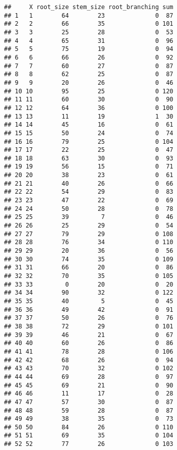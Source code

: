 \documentclass[
]{article}
\begin{document}
\begin{verbatim}
##     X root_size stem_size root_branching sum
## 1   1        64        23              0  87
## 2   2        66        35              0 101
## 3   3        25        28              0  53
## 4   4        65        31              0  96
## 5   5        75        19              0  94
## 6   6        66        26              0  92
## 7   7        60        27              0  87
## 8   8        62        25              0  87
## 9   9        20        26              0  46
## 10 10        95        25              0 120
## 11 11        60        30              0  90
## 12 12        64        36              0 100
## 13 13        11        19              1  30
## 14 14        45        16              0  61
## 15 15        50        24              0  74
## 16 16        79        25              0 104
## 17 17        22        25              0  47
## 18 18        63        30              0  93
## 19 19        56        15              0  71
## 20 20        38        23              0  61
## 21 21        40        26              0  66
## 22 22        54        29              0  83
## 23 23        47        22              0  69
## 24 24        50        28              0  78
## 25 25        39         7              0  46
## 26 26        25        29              0  54
## 27 27        79        29              0 108
## 28 28        76        34              0 110
## 29 29        20        36              0  56
## 30 30        74        35              0 109
## 31 31        66        20              0  86
## 32 32        70        35              0 105
## 33 33         0        20              0  20
## 34 34        90        32              0 122
## 35 35        40         5              0  45
## 36 36        49        42              0  91
## 37 37        50        26              0  76
## 38 38        72        29              0 101
## 39 39        46        21              0  67
## 40 40        60        26              0  86
## 41 41        78        28              0 106
## 42 42        68        26              0  94
## 43 43        70        32              0 102
## 44 44        69        28              0  97
## 45 45        69        21              0  90
## 46 46        11        17              0  28
## 47 47        57        30              0  87
## 48 48        59        28              0  87
## 49 49        38        35              0  73
## 50 50        84        26              0 110
## 51 51        69        35              0 104
## 52 52        77        26              0 103

\end{verbatim}
\end{document}
